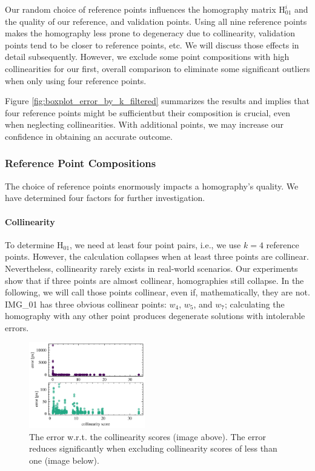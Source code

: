 Our random choice of reference points influences the homography matrix 
$\mathrm{H}_{01}^i$ and the quality of our reference, and validation points.
Using all nine reference points makes the homography less prone to 
degeneracy due to collinearity, validation points tend to be closer to 
reference points, etc. We will discuss those effects in detail subsequently. 
However, we exclude some point compositions with high collinearities
for our first, overall comparison to eliminate some significant outliers 
when only using four reference points.

Figure \ref{fig:boxplot_error_by_k_filtered} summarizes the results and implies that 
four reference points might be sufficient\textemdash but their composition is
crucial, even when neglecting collinearities.
With additional points, we may increase our confidence in obtaining
an accurate outcome. 


\subsubsection{Reference Point Compositions}
The choice of reference points enormously impacts a homography's quality. 
We have determined four factors for further investigation.

\paragraph{Collinearity}
To determine $\mathrm{H}_{01}$, we need at least four point pairs, i.e., 
we use $k=4$ reference points. However, the 
calculation collapses when at least three points are collinear. 
Nevertheless, collinearity rarely exists in 
real-world scenarios. Our experiments show that if three points are almost 
collinear, homographies still collapse. In the following, we will call those 
points collinear, even if, mathematically, they are not. 
IMG\_01 has three obvious collinear points: $w_4$, $w_5$, and $w_7$; 
calculating the homography with any other point produces degenerate 
solutions with intolerable errors. 

\begin{figure}
	\begin{center}
		\includegraphics[width=0.45\textwidth]{figures/collinearity_error.png}
	\end{center}
	\caption{The error w.r.t. the collinearity scores (image above). The 
	error reduces significantly when excluding collinearity scores of 
	less than one (image below).}
	\label{fig:collinearity_error}
\end{figure}

